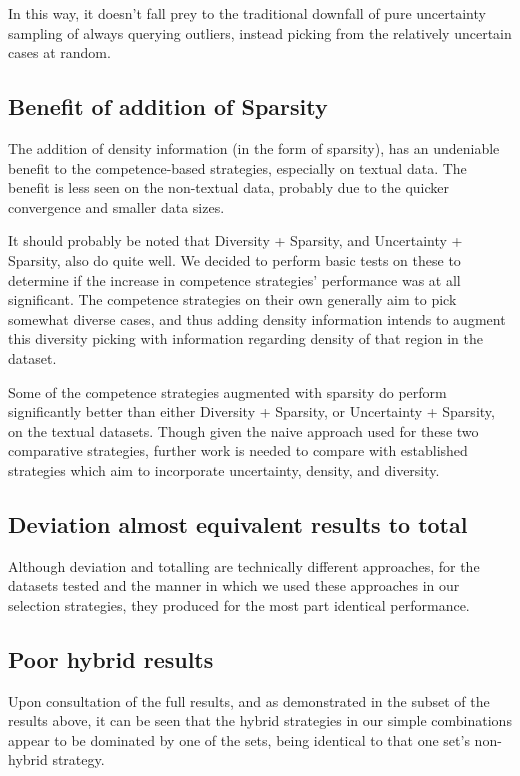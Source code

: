 \documentclass[a4paper,11pt]{report}
\begin{document}
In this way, it doesn't fall prey to the traditional downfall of pure uncertainty sampling of always querying outliers, instead picking from the relatively uncertain cases at random.

\subsection{Benefit of addition of Sparsity}

The addition of density information (in the form of sparsity), has an undeniable benefit to the competence-based strategies, especially on textual data. The benefit is less seen on the non-textual data, probably due to the quicker convergence and smaller data sizes.

It should probably be noted that Diversity + Sparsity, and Uncertainty + Sparsity, also do quite well. We decided to perform basic tests on these to determine if the increase in competence strategies' performance was at all significant. The competence strategies on their own generally aim to pick somewhat diverse cases, and thus adding density information intends to augment this diversity picking with information regarding density of that region in the dataset.

Some of the competence strategies augmented with sparsity do perform significantly better than either Diversity + Sparsity, or Uncertainty + Sparsity, on the textual datasets. Though given the naive approach used for these two comparative strategies, further work is needed to compare with established strategies which aim to incorporate uncertainty, density, and diversity.

\subsection{Deviation almost equivalent results to total}
Although deviation and totalling are technically different approaches, for the datasets tested and the manner in which we used these approaches in our selection strategies, they produced for the most part identical performance.

\subsection{Poor hybrid results}
Upon consultation of the full results, and as demonstrated in the subset of the results above, it can be seen that the hybrid strategies in our simple combinations appear to be dominated by one of the sets, being identical to that one set's non-hybrid strategy. 
\end{document}
